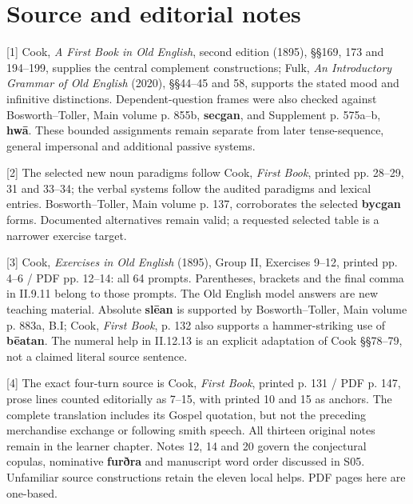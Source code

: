 \clearpage
\section*{Source and editorial notes}

\begingroup\fontsize{10}{12.8}\selectfont
[1] Cook, \emph{A First Book in Old English}, second edition (1895), §§169, 173 and 194–199, supplies the central complement constructions; Fulk, \emph{An Introductory Grammar of Old English} (2020), §§44–45 and 58, supports the stated mood and infinitive distinctions. Dependent-question frames were also checked against Bosworth–Toller, Main volume p. 855b, \textbf{secgan}, and Supplement p. 575a–b, \textbf{hwā}. These bounded assignments remain separate from later tense-sequence, general impersonal and additional passive systems.

[2] The selected new noun paradigms follow Cook, \emph{First Book}, printed pp. 28–29, 31 and 33–34; the verbal systems follow the audited paradigms and lexical entries. Bosworth–Toller, Main volume p. 137, corroborates the selected \textbf{bycgan} forms. Documented alternatives remain valid; a requested selected table is a narrower exercise target.

[3] Cook, \emph{Exercises in Old English} (1895), Group II, Exercises 9–12, printed pp. 4–6 /\allowbreak{} PDF pp. 12–14: all 64 prompts. Parentheses, brackets and the final comma in II.9.11 belong to those prompts. The Old English model answers are new teaching material. Absolute \textbf{slēan} is supported by Bosworth–Toller, Main volume p. 883a, B.I; Cook, \emph{First Book}, p. 132 also supports a hammer-striking use of \textbf{bēatan}. The numeral help in II.12.13 is an explicit adaptation of Cook §§78–79, not a claimed literal source sentence.

[4] The exact four-turn source is Cook, \emph{First Book}, printed p. 131 /\allowbreak{} PDF p. 147, prose lines counted editorially as 7–15, with printed 10 and 15 as anchors. The complete translation includes its Gospel quotation, but not the preceding merchandise exchange or following smith speech. All thirteen original notes remain in the learner chapter. Notes 12, 14 and 20 govern the conjectural copulas, nominative \textbf{furðra} and manuscript word order discussed in S05. Unfamiliar source constructions retain the eleven local helps. PDF pages here are one-based.

\endgroup

